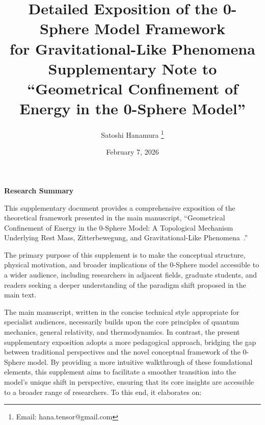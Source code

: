 \documentclass[12pt,letterpaper]{article}
\begin{document}

\title{Detailed Exposition of the 0-Sphere Model Framework\\
for Gravitational-Like Phenomena\\
\normalsize Supplementary Note to ``Geometrical Confinement of Energy in the 0-Sphere Model''}

\author{Satoshi Hanamura
\thanks{Email: hana.tensor@gmail.com}}

\date{February 7, 2026}

\maketitle

\tableofcontents


\begin{center}
\textbf{Research Summary}
\end{center}

\justifying

This supplementary document provides a comprehensive exposition of the theoretical framework presented in the main manuscript, ``Geometrical Confinement of Energy in the 0-Sphere Model: A Topological Mechanism Underlying Rest Mass, Zitterbewegung, and Gravitational-Like Phenomena~\cite{Hanamura2026geometrical}.''

The primary purpose of this supplement is to make the conceptual structure, physical motivation, and broader implications of the 0-Sphere model accessible to a wider audience, including researchers in adjacent fields, graduate students, and readers seeking a deeper understanding of the paradigm shift proposed in the main text.

The main manuscript, written in the concise technical style appropriate for specialist audiences, necessarily builds upon the core principles of quantum mechanics, general relativity, and thermodynamics. In contrast, the present supplementary exposition adopts a more pedagogical approach, bridging the gap between traditional perspectives and the novel conceptual framework of the 0-Sphere model. By providing a more intuitive walkthrough of these foundational elements, this supplement aims to facilitate a smoother transition into the model's unique shift in perspective, ensuring that its core insights are accessible to a broader range of researchers. To this end, it elaborates on:
\end{document}
